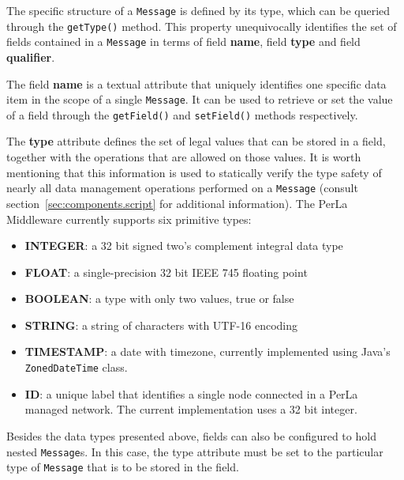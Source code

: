 The specific structure of a \texttt{Message} is defined by its type, which can
be queried through the \texttt{getType()} method. This property unequivocally
identifies the set of fields contained in a \texttt{Message} in terms of field
\textbf{name}, field \textbf{type} and field \textbf{qualifier}.

The field \textbf{name} is a textual attribute that uniquely identifies one
specific data item in the scope of a single \texttt{Message}. It can be used to
retrieve or set the value of a field through the \texttt{getField()} and
\texttt{setField()} methods respectively.

The \textbf{type} attribute defines the set of legal values that can be stored
in a field, together with the operations that are allowed on those values. It
is worth mentioning that this information is used to statically verify the type
safety of nearly all data management operations performed on a \texttt{Message}
(consult section~\ref{sec:components.script} for additional information). The
PerLa Middleware currently supports six primitive types:

\begin{itemize}

  \item \textbf{INTEGER}: a 32 bit signed two's complement integral data type

  \item \textbf{FLOAT}: a single-precision 32 bit IEEE 745 floating point

  \item \textbf{BOOLEAN}: a type with only two values, true or false

  \item \textbf{STRING}: a string of characters with UTF-16 encoding

  \item \textbf{TIMESTAMP}: a date with timezone, currently implemented using
      Java's \texttt{ZonedDateTime} class.

  \item \textbf{ID}: a unique label that identifies a single node connected in
      a PerLa managed network. The current implementation uses a 32 bit
      integer. 

\end{itemize}

Besides the data types presented above, fields can also be configured to hold
nested \texttt{Message}s. In this case, the type attribute must be set to the
particular type of \texttt{Message} that is to be stored in the field. 

